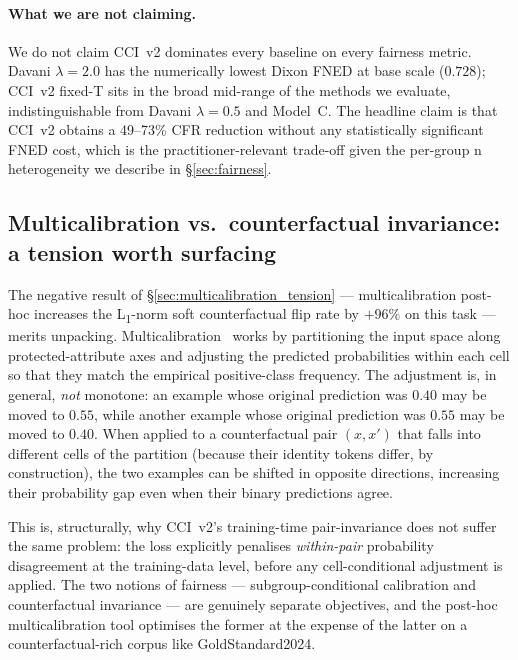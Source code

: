 \paragraph{What we are not claiming.}
We do not claim CCI~v2 dominates every baseline on every fairness metric. Davani $\lambda=2.0$ has the numerically lowest Dixon FNED at base scale ($0.728$); CCI~v2 fixed-T sits in the broad mid-range of the methods we evaluate, indistinguishable from Davani $\lambda=0.5$ and Model~C. The headline claim is that CCI~v2 obtains a 49--73\% CFR reduction without any statistically significant FNED cost, which is the practitioner-relevant trade-off given the per-group n heterogeneity we describe in \S\ref{sec:fairness}.

\subsection{Multicalibration vs.\ counterfactual invariance: a tension worth surfacing}
\label{sec:disc_multicalibration}

The negative result of \S\ref{sec:multicalibration_tension} --- multicalibration post-hoc increases the L\textsubscript{1}-norm soft counterfactual flip rate by $+96\%$ on this task --- merits unpacking. Multicalibration~\citep{hebertjohnson2018multicalibration} works by partitioning the input space along protected-attribute axes and adjusting the predicted probabilities within each cell so that they match the empirical positive-class frequency. The adjustment is, in general, \emph{not} monotone: an example whose original prediction was $0.40$ may be moved to $0.55$, while another example whose original prediction was $0.55$ may be moved to $0.40$. When applied to a counterfactual pair $(x, x')$ that falls into different cells of the partition (because their identity tokens differ, by construction), the two examples can be shifted in opposite directions, increasing their probability gap even when their binary predictions agree.

This is, structurally, why CCI~v2's training-time pair-invariance does not suffer the same problem: the loss explicitly penalises \emph{within-pair} probability disagreement at the training-data level, before any cell-conditional adjustment is applied. The two notions of fairness --- subgroup-conditional calibration and counterfactual invariance --- are genuinely separate objectives, and the post-hoc multicalibration tool optimises the former at the expense of the latter on a counterfactual-rich corpus like GoldStandard2024.

